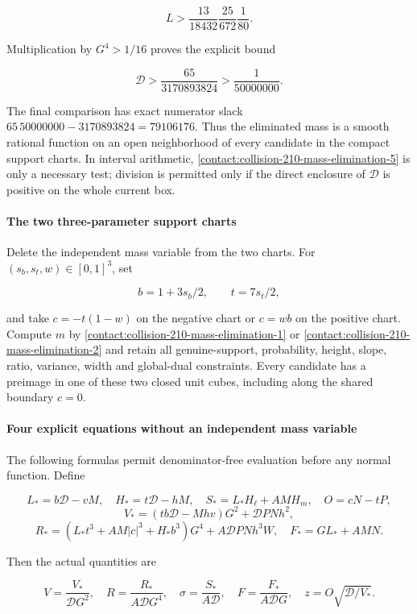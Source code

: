 \[
 L>\frac{13}{18432}\frac{25}{672}\frac1{80}.
\]

Multiplication by $G^4>1/16$ proves the explicit bound

\[
 \boxed{\mathcal D>\frac{65}{3170893824}>\frac1{50000000}.}
\tag{B.17.5}\label{contact:collision-210-mass-elimination-5}
\]

The final comparison has exact numerator slack
$65\,50000000-3170893824=79106176$. Thus the eliminated mass is a smooth
rational function on an open neighborhood of every candidate in the
compact support charts. In interval arithmetic, \eqref{contact:collision-210-mass-elimination-5} is only a necessary
test; division is permitted only if the direct enclosure of $\mathcal D$ is
positive on the whole current box.

\paragraph{The two three-parameter support charts}

Delete the independent mass variable from the two charts. For
$(s_b,s_t,w) \in [0,1]^3$, set

\[
 b=1+3s_b/2,\qquad t=7s_t/2,
\]

and take $c=-t(1-w)$ on the negative chart or $c=wb$ on the positive chart.
Compute $m$ by \eqref{contact:collision-210-mass-elimination-1} or \eqref{contact:collision-210-mass-elimination-2} and retain all genuine-support, probability,
height, slope, ratio, variance, width and global-dual constraints. Every candidate has a preimage in one of these two closed unit cubes,
including along the shared boundary $c=0$.

\paragraph{Four explicit equations without an independent mass variable}

The following formulas permit denominator-free evaluation before any
normal function. Define

\[
 L_*=b\mathcal D-vM,\quad H_*=t\mathcal D-hM,
 \quad S_*=L_*H_{\ell}+A MH_m,
 \quad O=cN-tP,
\]
\[
 V_*=(tb\mathcal D-Mhv)G^2+\mathcal D PN h^2,
\]
\[
 R_*=(L_*t^3+A M|c|^3+H_*b^3)G^4
                 +A\mathcal D PN h^3W,
\quad F_*=GL_*+A MN.
\]

Then the actual quantities are

\[
 V=\frac{V_*}{\mathcal D G^2},\quad
 R=\frac{R_*}{A\mathcal D G^4},\quad
 \sigma=\frac{S_*}{A\mathcal D},\quad
 F=\frac{F_*}{A\mathcal D G},\quad
 z=O\sqrt{\mathcal D/V_*}.
\tag{B.17.6}\label{contact:collision-210-mass-elimination-6}
\]

